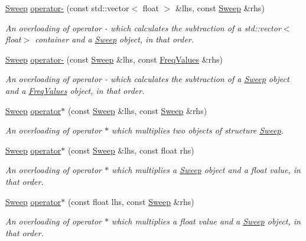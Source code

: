 \begin{DoxyCompactItemize}
\hyperlink{structSweep}{Sweep} \hyperlink{structSweep_a840a49afd7973b4b3d1020e15c4c9819}{operator-\/} (const std\+::vector$<$ float $>$ \&lhs, const \hyperlink{structSweep}{Sweep} \&rhs)
\begin{DoxyCompactList}\small\item\em An overloading of operator -\/ which calculates the subtraction of a {\ttfamily std\+::vector$<$float$>$} container and a {\itshape \hyperlink{structSweep}{Sweep}} object, in that order. \end{DoxyCompactList}\item 
\hyperlink{structSweep}{Sweep} \hyperlink{structSweep_a124ea929f6dba249bd4d6bf5476ab621}{operator-\/} (const \hyperlink{structSweep}{Sweep} \&lhs, const \hyperlink{structFreqValues}{Freq\+Values} \&rhs)
\begin{DoxyCompactList}\small\item\em An overloading of operator -\/ which calculates the subtraction of a {\itshape \hyperlink{structSweep}{Sweep}} object and a {\itshape \hyperlink{structFreqValues}{Freq\+Values}} object, in that order. \end{DoxyCompactList}\item 
\hyperlink{structSweep}{Sweep} \hyperlink{structSweep_a4739da92a36e5f8f17b0be140dd327f6}{operator$\ast$} (const \hyperlink{structSweep}{Sweep} \&lhs, const \hyperlink{structSweep}{Sweep} \&rhs)
\begin{DoxyCompactList}\small\item\em An overloading of operator $\ast$ which multiplies two objects of structure {\itshape \hyperlink{structSweep}{Sweep}}. \end{DoxyCompactList}\item 
\hyperlink{structSweep}{Sweep} \hyperlink{structSweep_a12c1f3e5e4869781ca7d90a50f334606}{operator$\ast$} (const \hyperlink{structSweep}{Sweep} \&lhs, const float rhs)
\begin{DoxyCompactList}\small\item\em An overloading of operator $\ast$ which multiplies a {\itshape \hyperlink{structSweep}{Sweep}} object and a {\itshape float} value, in that order. \end{DoxyCompactList}\item 
\hyperlink{structSweep}{Sweep} \hyperlink{structSweep_ad4aac4ab6e7ea49d5bc9ebfa83eb07be}{operator$\ast$} (const float lhs, const \hyperlink{structSweep}{Sweep} \&rhs)
\begin{DoxyCompactList}\small\item\em An overloading of operator $\ast$ which multiplies a {\itshape float} value and a {\itshape \hyperlink{structSweep}{Sweep}} object, in that order. \end{DoxyCompactList}\item 

\end{DoxyCompactItemize}

